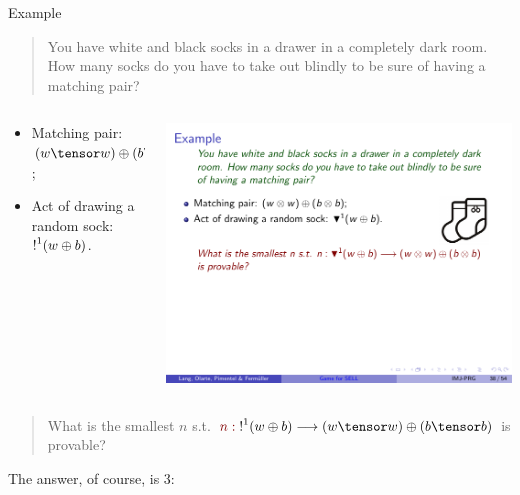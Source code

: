 \documentclass[9pt]{beamer}
\newcommand{\empha}[1]{{\color{darkgreen} #1}}
\newcommand{\emphdr}[1]{{\color{darkred} #1}}
\begin{document}
\begin{frame}{Example}
\begin{quote}
\empha{You have white and black socks in a drawer in a completely dark room. How many socks do you have to take out blindly to be sure of having a matching pair? }
\end{quote} \pause

\bigskip 
\begin{minipage}[0.2\textheight]{\textwidth}
\begin{columns}[T]
\begin{column}{0.8\textwidth}
\begin{itemize}
\item Matching pair: $(w\tensor w)\oplus(b\tensor b)$; 
\item Act of drawing a random sock: $\hbox{$\mathop{!}^{1}$}(w\oplus b)$. 
\end{itemize}
\end{column}
\begin{column}{0.2\textwidth}
\includegraphics[scale=0.5]{../figs/socks}
\end{column}
\end{columns}
\end{minipage} \pause

\begin{quote}
\emphdr{What is the smallest $n$ s.t. $\emphdr{n:}\;\nbang{1}(w\oplus b)\lra (w\tensor w)\oplus(b\tensor b)$ is provable?}
\end{quote} \pause
The answer, of course, is $3$: 


\end{frame}
\end{document}
